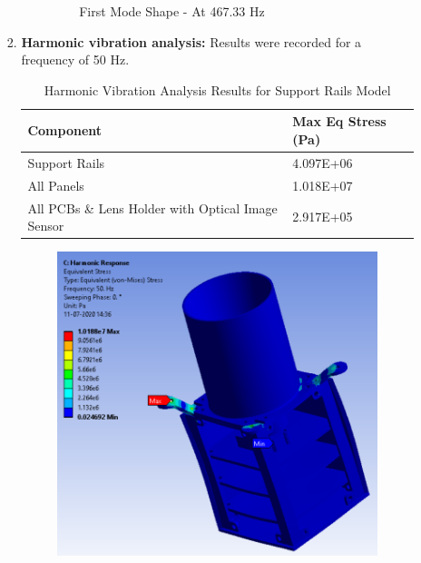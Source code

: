 \documentclass[../../main.tex]{subfiles}
\begin{document}
\begin{enumerate}
\begin{enumerate}
\begin{enumerate}
\begin{itemize}
\begin{figure}[H]
                    \caption{First Mode Shape - At 467.33 Hz}
                    \label{fig:sys_CAD}
                \end{figure}
                \end{itemize}
                \newpage
                \item \textbf{Harmonic vibration analysis:} Results were recorded for a frequency of 50 Hz.
                \begin{table}[h!]
                    \centering
                    \begin{tabular}{|p{8cm}|p{3cm}|}
                        \hline
                        \textbf{Component} & \textbf{Max Eq Stress (Pa)} \\
                        \hline
                        
                        Support Rails & 4.097E+06 \\
                        \hline
                        All Panels & 1.018E+07 \\
                        \hline
                        All PCBs \& Lens Holder with Optical Image Sensor & 2.917E+05 \\
                        \hline
                    \end{tabular}
                    \caption{Harmonic Vibration Analysis Results for Support Rails Model}
                    \label{tab:my_label}
                \end{table}
                \begin{figure}[H]
                    \centering
                    \includegraphics[scale=0.9]{Figures/Mechanical/Harmonic_01.PNG}

\end{figure}
\end{enumerate}
\end{enumerate}
\end{enumerate}
\end{document}
